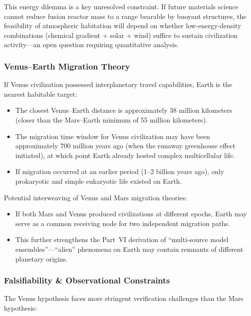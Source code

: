 \documentclass[aps,prd,twocolumn,superscriptaddress,nofootinbib]{revtex4-2}
\begin{document}
This energy dilemma is a key unresolved constraint. If future materials science cannot reduce fusion reactor mass to a range bearable by buoyant structures, the feasibility of atmospheric habitation will depend on whether low-energy-density combinations (chemical gradient + solar + wind) suffice to sustain civilization activity---an open question requiring quantitative analysis.

\subsubsection{Venus--Earth Migration Theory}\label{sec:venus-earth-migration}

If Venus civilization possessed interplanetary travel capabilities, Earth is the nearest habitable target:

\begin{itemize}
  \item The closest Venus--Earth distance is approximately 38 million kilometers (closer than the Mars--Earth minimum of 55 million kilometers).
  \item The migration time window for Venus civilization may have been approximately 700 million years ago (when the runaway greenhouse effect initiated), at which point Earth already hosted complex multicellular life.
  \item If migration occurred at an earlier period (1--2 billion years ago), only prokaryotic and simple eukaryotic life existed on Earth.
\end{itemize}

Potential interweaving of Venus and Mars migration theories:

\begin{itemize}
  \item If both Mars and Venus produced civilizations at different epochs, Earth may serve as a common receiving node for two independent migration paths.
  \item This further strengthens the Part~VI derivation of ``multi-source model ensembles''---``alien'' phenomena on Earth may contain remnants of different planetary origins.
\end{itemize}

\subsubsection{Falsifiability \& Observational Constraints}\label{sec:venus-falsify}

The Venus hypothesis faces more stringent verification challenges than the Mars hypothesis:
\end{document}
